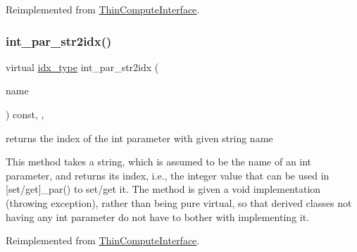 Reimplemented from \mbox{\hyperlink{class_s_m_spp__di__unipi__it_1_1_thin_compute_interface_a3d3d1ca3218d2d640614ed75a960ef01}{Thin\+Compute\+Interface}}.

\mbox{\label{class_s_m_spp__di__unipi__it_1_1_f_row_constraint_ae281b6699b0707a5cdc1e82b76d26c09}} 
\subsubsection{\texorpdfstring{int\+\_\+par\+\_\+str2idx()}{int\_par\_str2idx()}}
{\footnotesize\ttfamily virtual \mbox{\hyperlink{class_s_m_spp__di__unipi__it_1_1_thin_compute_interface_aa3d710629ad8c434286726ad810c3b47}{idx\+\_\+type}} int\+\_\+par\+\_\+str2idx (\begin{DoxyParamCaption}\item[{const std\+::string \&}]{name }\end{DoxyParamCaption}) const\hspace{0.3cm}{\ttfamily [inline]}, {\ttfamily [override]}, {\ttfamily [virtual]}}



returns the index of the int parameter with given string name 

This method takes a string, which is assumed to be the name of an int parameter, and returns its index, i.\+e., the integer value that can be used in \mbox{[}set/get\mbox{]}\+\_\+par() to set/get it. The method is given a void implementation (throwing exception), rather than being pure virtual, so that derived classes not having any int parameter do not have to bother with implementing it. 

Reimplemented from \mbox{\hyperlink{class_s_m_spp__di__unipi__it_1_1_thin_compute_interface_a69c6857c4288135135e8b6bbcf24252a}{Thin\+Compute\+Interface}}.

\mbox{\label{class_s_m_spp__di__unipi__it_1_1_f_row_constraint_ae2efd3cdf1d4fd41cbafda3c49facfa5}} 
